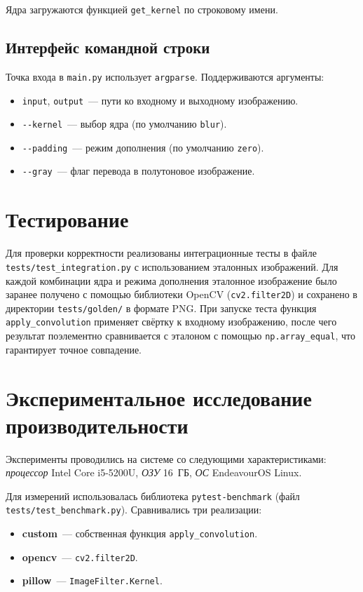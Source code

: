 \documentclass[a4paper]{article}
\begin{document}
Ядра загружаются функцией \verb|get_kernel| по строковому имени.

\subsection{Интерфейс командной строки}

Точка входа в \verb|main.py| использует \verb|argparse|. Поддерживаются аргументы:
\begin{itemize}
    \item \verb|input|, \verb|output|~--- пути ко входному и выходному изображению.
    \item \verb|--kernel|~--- выбор ядра (по умолчанию \verb|blur|).
    \item \verb|--padding|~--- режим дополнения (по умолчанию \verb|zero|).
    \item \verb|--gray|~--- флаг перевода в полутоновое изображение.
\end{itemize}

\section{Тестирование}

Для проверки корректности реализованы интеграционные тесты в файле \verb|tests/test_integration.py| с использованием эталонных изображений. Для каждой комбинации ядра и режима дополнения эталонное изображение было заранее получено с помощью библиотеки OpenCV (\verb|cv2.filter2D|) и сохранено в директории \verb|tests/golden/| в формате PNG. При запуске теста функция \verb|apply_convolution| применяет свёртку к входному изображению, после чего результат поэлементно сравнивается с эталоном с помощью \verb|np.array_equal|, что гарантирует точное совпадение.

\section{Экспериментальное исследование производительности}

Эксперименты проводились на системе со следующими характеристиками:
\textit{процессор} Intel Core i5-5200U, \textit{ОЗУ} 16~ГБ, \textit{ОС} EndeavourOS Linux.

Для измерений использовалась библиотека \verb|pytest-benchmark| (файл \verb|tests/test_benchmark.py|). Сравнивались три реализации:
\begin{itemize}
    \item \textbf{custom}~--- собственная функция \verb|apply_convolution|.
    \item \textbf{opencv}~--- \verb|cv2.filter2D|.
    \item \textbf{pillow}~--- \verb|ImageFilter.Kernel|.
\end{itemize}
\end{document}
